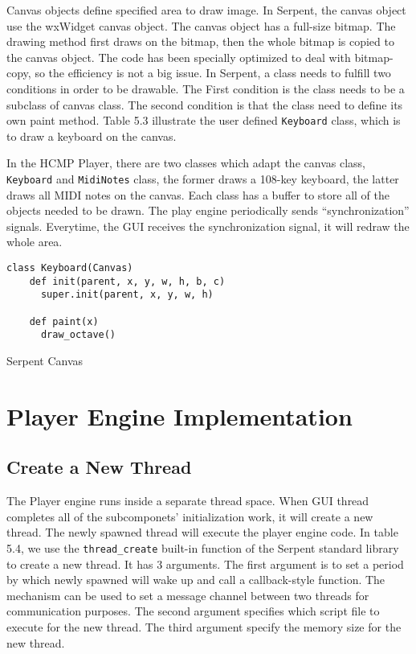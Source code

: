 Canvas objects define specified area to draw image. In Serpent, the canvas 
object use the wxWidget canvas object. The canvas object has a full-size bitmap.
The drawing method
first draws on the bitmap, then the whole bitmap is copied to the canvas object. 
The code has been specially optimized to deal with bitmap-copy, so the efficiency 
is not a big issue. In Serpent, a class needs to fulfill two conditions in order 
to be drawable. The First condition is
the class needs to be a subclass of canvas class. The second condition is that 
the class need to define its own paint method. Table 5.3 illustrate the user 
defined \texttt{Keyboard} class, which is to draw a keyboard on the canvas.

In the HCMP Player, there are two classes which adapt the canvas class, 
\texttt{Keyboard} and \texttt{MidiNotes} class, the former draws a 108-key 
keyboard, the latter draws all MIDI notes on the canvas. Each class has a buffer 
to store all of the objects needed to be drawn. The play engine periodically 
sends ``synchronization'' signals. Everytime, the GUI receives the synchronization 
signal, it will redraw the whole area.

\begin{table}[htdp]
\centering

\begin{lstlisting}
class Keyboard(Canvas)
    def init(parent, x, y, w, h, b, c)
      super.init(parent, x, y, w, h)

    def paint(x)
      draw_octave()
\end{lstlisting}
\caption[Serpent Canvas]{Serpent Canvas}
\end{table}

\section{Player Engine Implementation}

\subsection{Create a New Thread}
The Player engine runs inside a separate thread space. When GUI thread completes 
all of the subcomponets' initialization work, it will create a new thread. The newly
spawned thread will execute the player engine code. In table 5.4, we use the   
\texttt{thread\_create} built-in function of the Serpent standard library to create 
a new thread. It has 3 arguments. 
The first argument is to set a period by which newly spawned will wake up and call 
a callback-style function. The mechanism can be used to set a message channel between 
two threads for communication purposes. The second argument specifies 
which script file to execute for the new thread. The third argument specify the 
memory size for the new thread.

